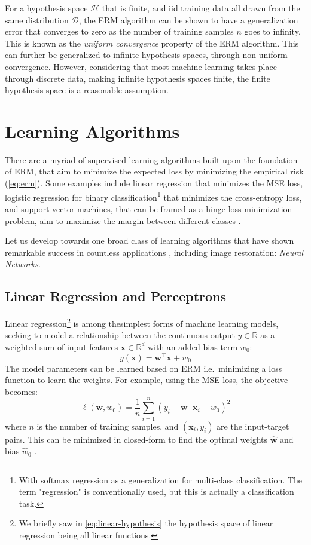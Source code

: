 For a hypothesis space $\mathcal{H}$ that is finite, and \gls{iid} training data all drawn from the same distribution $\mathcal{D}$, the \gls{ERM} algorithm can be shown to have a generalization error that converges to zero as the number of training samples $n$ goes to infinity. This is known as the \textit{uniform convergence} property of the \gls{ERM} algorithm. This can further be generalized to infinite hypothesis spaces, through non-uniform convergence. However, considering that most machine learning takes place through discrete data, making infinite hypothesis spaces finite, the finite hypothesis space is a reasonable assumption.
\section{Learning Algorithms}
There are a myriad of supervised learning algorithms built upon the foundation of \gls{ERM}, that aim to minimize the expected loss by minimizing the empirical risk (\cref{eq:erm}). Some examples include linear regression that minimizes the \gls{MSE} loss, logistic regression for binary classification\footnote{With softmax regression as a generalization for multi-class classification. The term "regression" is conventionally used, but this is actually a classification task.} that minimizes the cross-entropy loss, and support vector machines, that can be framed as a hinge loss minimization problem, aim to maximize the margin between different classes \cite{bishopPatternRecognitionMachine2006}.

Let us develop towards one broad class of learning algorithms that have shown remarkable success in countless applications , including image restoration: \textit{Neural Networks}.

\subsection{Linear Regression and Perceptrons}
Linear regression\footnote{We briefly saw in \cref{eq:linear-hypothesis} the hypothesis space of linear regression being all linear functions.} is among thesimplest forms of machine learning models, seeking to model a relationship between the continuous output $y \in \mathbb{R}$ as a weighted sum of input features $\mathbf{x} \in \mathbb{R}^d$ with an added bias term $w_0$:
\begin{equation}\label{eq:linear-regression}
    y(\mathbf{x}) = \mathbf{w}^\top \mathbf{x} + w_0
\end{equation}
The model parameters can be learned based on \gls{ERM} i.e.\ minimizing a loss function to learn the weights. For example, using the \gls{MSE} loss, the objective becomes:
\begin{equation}\label{eq:mse-loss}
    \ell(\mathbf{w}, w_0) = \frac{1}{n} \sum_{i=1}^{n} (y_i - \mathbf{w}^\top \mathbf{x}_i - w_0)^2
\end{equation}
where $n$ is the number of training samples, and $(\mathbf{x}_i, y_i)$ are the input-target pairs. This can be minimized in closed-form to find the optimal weights $\hat{\mathbf{w}}$ and bias $\hat{w}_0$ \cite{bishopPatternRecognitionMachine2006}.


